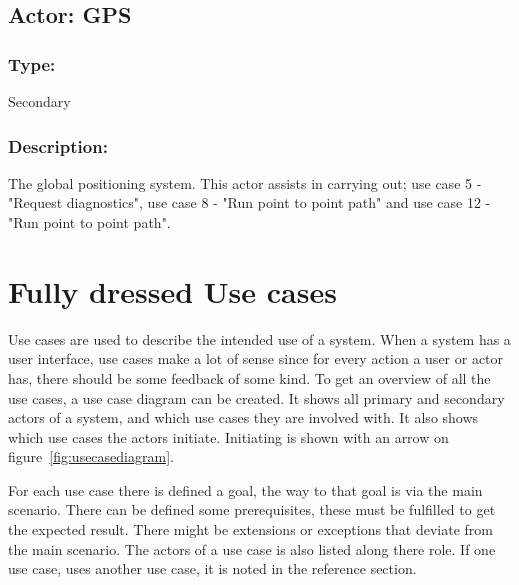 
\subsection{Actor: GPS}
\subsubsection*{Type:}
Secondary

\subsubsection*{Description:}
The global positioning system. This actor assists in carrying out; use case 5 - "Request diagnostics", use case 8 - "Run point to point path" and use case 12 - "Run point to point path".


\section{Fully dressed Use cases }
\label{sec:usecases}
Use cases are used to describe the intended use of a system. When a system has a user interface, use cases make a lot of sense since for every action a user or actor has, there should be some feedback of some kind. To get an overview of all the use cases, a use case diagram can be created. It shows all primary and secondary actors of a system, and which use cases they are involved with. It also shows which use cases the actors initiate. Initiating is shown with an arrow on figure~\ref{fig:usecasediagram}.

For each use case there is defined a goal, the way to that goal is via the main scenario. There can be defined some prerequisites, these must be fulfilled to get the expected result. There might be extensions or exceptions that deviate from the main scenario. The actors of a use case is also listed along there role. If one use case, uses another use case, it is noted in the reference section.

